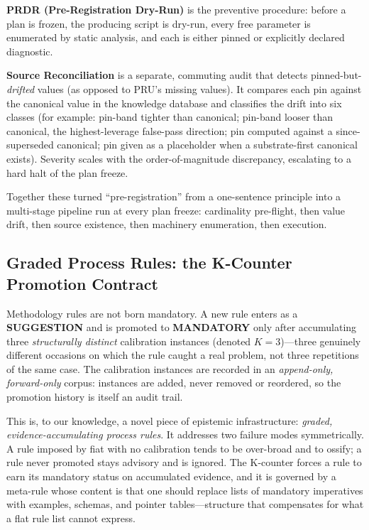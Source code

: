 \documentclass[12pt,a4paper]{article}
\begin{document}
\textbf{PRDR (Pre-Registration Dry-Run)} is the preventive procedure: before a plan is frozen, the producing script is dry-run, every free parameter is enumerated by static analysis, and each is either pinned or explicitly declared diagnostic.

\textbf{Source Reconciliation} is a separate, commuting audit that detects pinned-but-\emph{drifted} values (as opposed to PRU's missing values). It compares each pin against the canonical value in the knowledge database and classifies the drift into six classes (for example: pin-band tighter than canonical; pin-band looser than canonical, the highest-leverage false-pass direction; pin computed against a since-superseded canonical; pin given as a placeholder when a substrate-first canonical exists). Severity scales with the order-of-magnitude discrepancy, escalating to a hard halt of the plan freeze.

Together these turned ``pre-registration'' from a one-sentence principle into a multi-stage pipeline run at every plan freeze: cardinality pre-flight, then value drift, then source existence, then machinery enumeration, then execution.

\subsection{Graded Process Rules: the K-Counter Promotion Contract}
\label{sec:floor-kcounter}

Methodology rules are not born mandatory. A new rule enters as a \textbf{SUGGESTION} and is promoted to \textbf{MANDATORY} only after accumulating three \emph{structurally distinct} calibration instances (denoted $K=3$)---three genuinely different occasions on which the rule caught a real problem, not three repetitions of the same case. The calibration instances are recorded in an \emph{append-only, forward-only} corpus: instances are added, never removed or reordered, so the promotion history is itself an audit trail.

This is, to our knowledge, a novel piece of epistemic infrastructure: \emph{graded, evidence-accumulating process rules}. It addresses two failure modes symmetrically. A rule imposed by fiat with no calibration tends to be over-broad and to ossify; a rule never promoted stays advisory and is ignored. The K-counter forces a rule to earn its mandatory status on accumulated evidence, and it is governed by a meta-rule whose content is that one should replace lists of mandatory imperatives with examples, schemas, and pointer tables---structure that compensates for what a flat rule list cannot express.
\end{document}
